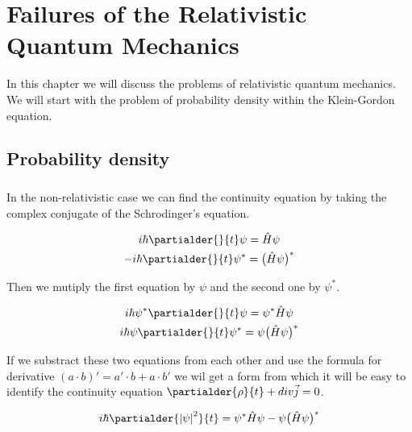 \chapter{Failures of the Relativistic Quantum Mechanics}

In this chapter we will discuss the problems of relativistic quantum mechanics. We will start
with the problem of probability density within the Klein-Gordon equation.

\section{Probability density}

\paragraph{} In the non-relativistic case we can find the continuity equation by taking the complex conjugate
of the Schrodinger's equation.

\begin{equation*}
    \begin{gathered}
        i \hbar \partialder{}{t} \psi = \hat{H} \psi \\
        - i \hbar \partialder{}{t} \psi^{*} = \big(\hat{H} \psi \big)^{*}
    \end{gathered}
\end{equation*}

Then we mutiply the first equation by $\psi$ and the second one by $\psi^{*}$.

\begin{equation*}
    \begin{gathered}
        i \hbar \psi^{*} \partialder{}{t} \psi = \psi^{*} \hat{H} \psi \\
        i \hbar \psi \partialder{}{t} \psi^{*} = \psi \big(\hat{H} \psi \big)^{*}
    \end{gathered}
\end{equation*}

If we substract these two equations from each other and use the formula for derivative $(a \cdot b)' = a' \cdot b + a \cdot b'$
we wil get a form from which it will be easy to identify the continuity equation $\partialder{\rho}{t} + div \vec{j} = 0$.

\begin{equation*}
    i \hbar \partialder{\left|\psi\right|^{2}}{t}  = \psi^{*} \hat{H} \psi - \psi \big(\hat{H} \psi \big)^{*}
\end{equation*}

